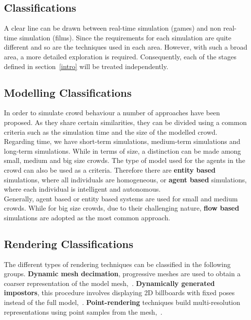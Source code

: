 \documentclass[6pt]{article} %
\begin{document}
\begin{multicols}{2}
\section{Classifications}

A clear line can be drawn between real-time simulation (games) and non real-time simulation (films).
Since the requirements for each simulation are quite different and so are the techniques used in each area.
However, with such a broad area, a more detailed exploration is required.
Consequently, each of the stages defined in section~\ref{intro} will be treated independently.

\subsection{Modelling Classifications}
\label{subsec:ModelClassification}

In order to simulate crowd behaviour a number of approaches have been proposed.
As they share certain similarities, they can be divided using a common criteria such as the simulation time  and the size of the modelled crowd.
Regarding time, we have short-term simulations, medium-term simulations and long-term simulations.
While in terms of size, a distinction can be made among small, medium and big size crowds.
The type of model used for the agents in the crowd can also be used as a criteria.
Therefore there are \textbf{entity based} simulations, where all individuals are homogeneous, or \textbf{agent based} simulations, where each individual is intelligent and autonomous.\\

Generally, agent based or entity based systems are used for small and medium crowds.
While for big size crowds, due to their challenging nature, \textbf{flow based} simulations are adopted as the most common approach.

\subsection{Rendering Classifications}
\label{subsec:RenderingClassification}

The different types of rendering techniques can be classified in the following groups.
\textbf{Dynamic mesh decimation}, progressive meshes are used to obtain a coarser representation of the model mesh,~\cite{Hoppe1996}.
\textbf{Dynamically generated impostors}, this procedure involves displaying 2D billboards with fixed poses instead of the full model,~\cite{Aubel2000}.
\textbf{Point-rendering} techniques build multi-resolution representations using point samples from the mesh,~\cite{Wand2002}.


\end{multicols}
\end{document}
